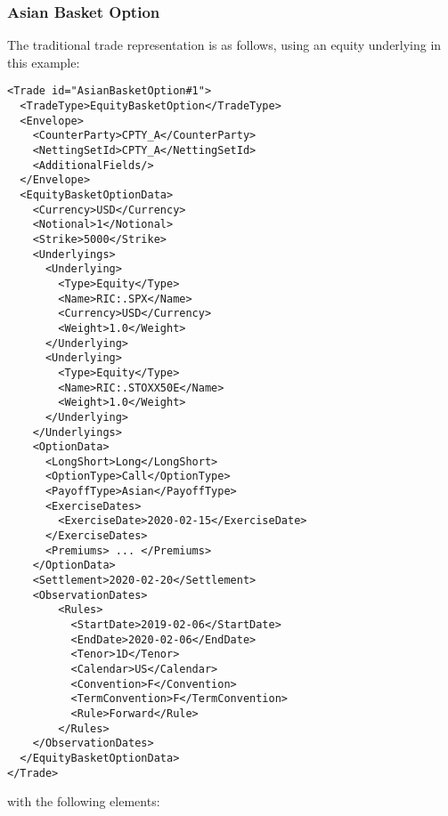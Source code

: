 \subsubsection*{Asian Basket Option}

The traditional trade representation is as follows, using an equity underlying in this example:

\begin{verbatim}
<Trade id="AsianBasketOption#1">
  <TradeType>EquityBasketOption</TradeType>
  <Envelope>
    <CounterParty>CPTY_A</CounterParty>
    <NettingSetId>CPTY_A</NettingSetId>
    <AdditionalFields/>
  </Envelope>
  <EquityBasketOptionData>
    <Currency>USD</Currency>
    <Notional>1</Notional>
    <Strike>5000</Strike>
    <Underlyings>
      <Underlying>
        <Type>Equity</Type>
        <Name>RIC:.SPX</Name>
        <Currency>USD</Currency>
        <Weight>1.0</Weight>
      </Underlying>
      <Underlying>
        <Type>Equity</Type>
        <Name>RIC:.STOXX50E</Name>
        <Weight>1.0</Weight>
      </Underlying>
    </Underlyings>
    <OptionData>
      <LongShort>Long</LongShort>
      <OptionType>Call</OptionType>
      <PayoffType>Asian</PayoffType>
      <ExerciseDates>
        <ExerciseDate>2020-02-15</ExerciseDate>
      </ExerciseDates>
      <Premiums> ... </Premiums>  
    </OptionData>
    <Settlement>2020-02-20</Settlement>
    <ObservationDates>
        <Rules>
          <StartDate>2019-02-06</StartDate>
          <EndDate>2020-02-06</EndDate>
          <Tenor>1D</Tenor>
          <Calendar>US</Calendar>
          <Convention>F</Convention>
          <TermConvention>F</TermConvention>
          <Rule>Forward</Rule>
        </Rules>
    </ObservationDates>
  </EquityBasketOptionData>
</Trade>
\end{verbatim}

with the following elements:

